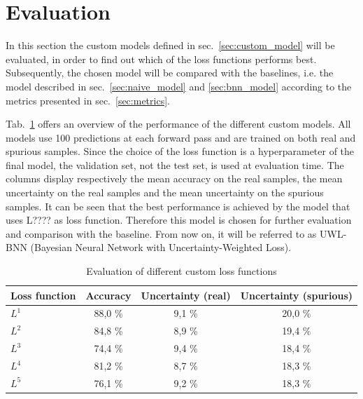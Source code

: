 \documentclass[11pt,twoside,a4paper]{article}
\begin{document}
\section{Evaluation}
\label{sec:evaluation}
In this section the custom models defined in sec.~\ref{sec:custom_model} will be evaluated, in order to find out which of the loss functions performs best. Subsequently, the chosen model will be compared with the baselines, i.e. the model described in sec.~\ref{sec:naive_model} and \ref{sec:bnn_model} according to the metrics presented in sec.~\ref{sec:metrics}.

Tab.~\ref{tab:custom} offers an overview of the performance of the different custom models. All models use 100 predictions at each forward pass and are trained on both real and spurious samples. Since the choice of the loss function is a hyperparameter of the final model, the validation set, not the test set, is used at evaluation time. The columns display respectively the mean accuracy on the real samples, the mean uncertainty on the real samples and the mean uncertainty on the spurious samples. It can be seen that the best performance is achieved by the model that uses L???? as loss function. Therefore this model is chosen for further evaluation and comparison with the baseline. From now on, it will be referred to as UWL-BNN (Bayesian Neural Network with Uncertainty-Weighted Loss).

\begin{table}[!h]
  \begin{adjustwidth}{-.5in}{-.5in}
  \begin{center}
    \begin{tabular}{l | c | c | c}
      Loss function	& Accuracy	& Uncertainty (real)	& Uncertainty (spurious) \\
      \hline
      \(L^1\)		& 88,0 \%		& 9,1  \% 			& 20,0 \% \\      
      \(L^2\)		& 84,8 \%		& 8,9 \% 			& 19,4 \% \\      
      \(L^3\)		& 74,4 \%		& 9,4 \% 			& 18,4 \% \\      
      \(L^4\)		& 81,2 \%		& 8,7 \% 			& 18,3 \% \\      
      \(L^5\)		& 76,1 \%		& 9,2 \% 			& 18,3 \% \\      
    \end{tabular}
    \caption{Evaluation of different custom loss functions}
    \label{tab:custom}
  \end{center}
  \end{adjustwidth}
\end{table}
\end{document}
